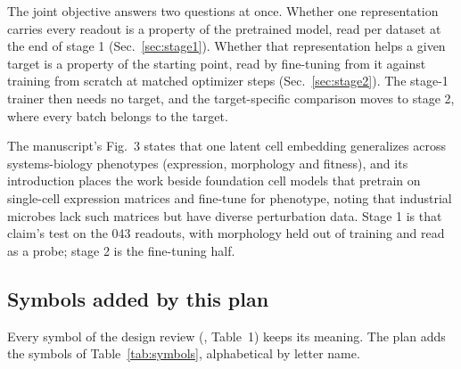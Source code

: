 The joint objective answers two questions at once. Whether one representation carries every
readout is a property of the pretrained model, read per dataset at the end of stage 1
(Sec.~\ref{sec:stage1}). Whether that representation helps a given target is a property of
the starting point, read by fine-tuning from it against training from scratch at matched
optimizer steps (Sec.~\ref{sec:stage2}). The stage-1 trainer then needs no target, and the
target-specific comparison moves to stage 2, where every batch belongs to the target.

The manuscript's Fig.~3 states that one latent cell embedding generalizes across
systems-biology phenotypes (expression, morphology and fitness), and its introduction places
the work beside foundation cell models that pretrain on single-cell expression matrices and
fine-tune for phenotype, noting that industrial microbes lack such matrices but have diverse
perturbation data. Stage 1 is that claim's test on the 043 readouts, with morphology held out
of training and read as a probe; stage 2 is the fine-tuning half.

\subsection{Symbols added by this plan}
\label{sec:symbols}

Every symbol of the design review (, Table~1) keeps its meaning. The plan adds the
symbols of Table~\ref{tab:symbols}, alphabetical by letter name.

